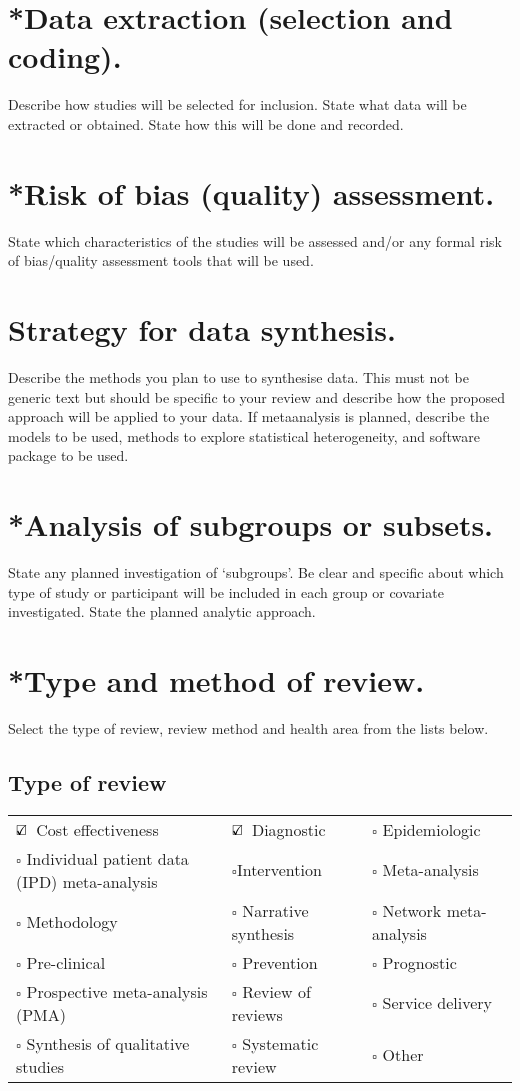 \documentclass[11pt,letterpaper]{article}
\newcommand*{\checkedbox}{$\text{\rlap{$\checkmark$}}\square $\ }%
\newcommand{\dataitem}[2]{
	\section{#1}
	\textcolor{codegray}{#2} \\
}
\begin{document}
\dataitem{*Data extraction (selection and coding).}{Describe how studies will be selected for inclusion. State what data will be extracted or obtained. State how this will be done and recorded.}

\dataitem{*Risk of bias (quality) assessment.}{State which characteristics of the studies will be assessed and/or any formal risk of bias/quality assessment tools that will be used.}

\dataitem{ Strategy for data synthesis.}{Describe the methods you plan to use to synthesise data. This must not be generic text but should be specific to your review and describe how the proposed approach will be applied to your data. If metaanalysis is planned, describe the models to be used, methods to explore statistical heterogeneity, and software package to be used.}		


\dataitem{*Analysis of subgroups or subsets.}{State any planned investigation of ‘subgroups’. Be clear and specific about which type of study or participant will be included in each group or covariate investigated. State the planned analytic approach.}

\dataitem{*Type and method of review.}{Select the type of review, review method and health area from the lists below.}
\subsection*{Type of review}
\begin{tabular}{ p{5.5 cm}p{5.5cm} p{5.5cm}}
	\checkedbox Cost effectiveness & \checkedbox Diagnostic &$\square$ Epidemiologic\\
	$\square$ Individual patient data (IPD) meta-analysis &$\square$Intervention&$\square$ Meta-analysis\\
	$\square$ Methodology &$\square$ Narrative synthesis \ &$\square$ Network meta-analysis\\ 
	$\square$ Pre-clinical &$\square$ Prevention \ &$\square$ Prognostic\\
	$\square$ Prospective meta-analysis (PMA) &$\square$ Review of reviews \ &$\square$ Service delivery\\
	$\square$ Synthesis of qualitative studies  &$\square$ Systematic review \ &$\square$ Other\\
\end{tabular}
\end{document}
